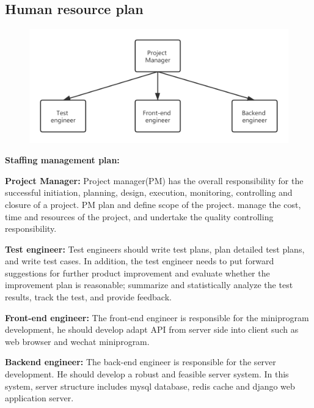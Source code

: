 \documentclass[runningheads]{llncs}
\begin{document}
\subsection{Human resource plan}
\begin{figure}[H]
\centering
\includegraphics[width=4.5in]{figure/1.png}
\end{figure}
\textbf{Staffing management plan:}

\noindent
\textbf{Project Manager:} Project manager(PM) has the overall responsibility for the successful initiation, planning, design, execution, monitoring, controlling and closure of a project. PM plan and define scope of the project. manage the cost, time and resources of the project, and undertake the quality controlling responsibility.

\noindent\textbf{Test engineer:} Test engineers should write test plans, plan detailed test plans, and write test cases. In addition, the test engineer needs to put forward suggestions for further product improvement and evaluate whether the improvement plan is reasonable; summarize and statistically analyze the test results, track the test, and provide feedback.

\noindent\textbf{Front-end engineer:} The front-end engineer is responsible for the miniprogram development, he should develop adapt API from server side into client such as web browser and wechat miniprogram. 

\noindent\textbf{Backend engineer:} The back-end engineer is responsible for the server development. He should develop a robust and feasible server system. In this system, server structure includes mysql database, redis cache and django web application server.
\end{document}
